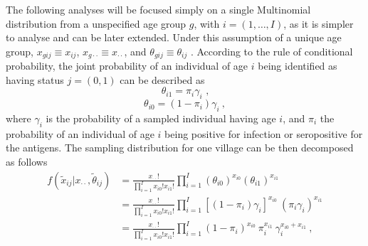 The following analyses will be focused simply on a single Multinomial distribution from a unspecified age group $g$, with $i=(1,\dots,I)$, as it is simpler to analyse and can be later extended.
Under this assumption of a unique age group, $x_{gij}\equiv x_{ij}$, $x_{g\cdot\cdot}\equiv x_{\cdot\cdot}$, and $\theta_{gij}\equiv\theta_{ij}$ .
According to the rule of conditional probability, the joint probability of an individual of age $i$ being identified as having status $j=(0,1)$ can be described as
%
$$\theta_{i1} = \pi_i \gamma_i\text{\ ,}$$ $$\theta_{i0} = (1-\pi_i) \gamma_i\ ,$$
%
\noindent
where $\gamma_i$ is the probability of a sampled individual having age $i$, and $\pi_i$ the probability of an individual of age $i$ being positive for infection or seropositive for the antigens.
The sampling distribution for one village can be then decomposed as follows
%
\begin{equation}
    \label{eq:multinomial.distribution}
    \begin{split}
    f(\tilde{x}_{ij} | x_{\cdot\cdot}, \tilde{\theta}_{ij}) & = \frac{x_{\cdot\cdot}!}{\prod_{i=1}^Ix_{i0}!x_{i1}!} \prod_{i=1}^I (\theta_{i0})^{x_{i0}} (\theta_{i1})^{x_{i1}} \\
    & = \frac{x_{\cdot\cdot}!}{\prod_{i=1}^Ix_{i0}!x_{i1}!} \prod_{i=1}^I [(1-\pi_i)\gamma_i]^{x_{i0}} \ (\pi_i \gamma_i)^{x_{i1}} \\
    & = \frac{x_{\cdot\cdot}!}{\prod_{i=1}^Ix_{i0}!x_{i1}!} \prod_{i=1}^I (1-\pi_i)^{x_{i0}} \ \pi_i^{x_{i1}} \ \gamma_i^{x_{i0}+x_{i1}}\ ,
    \end{split}
\end{equation}
